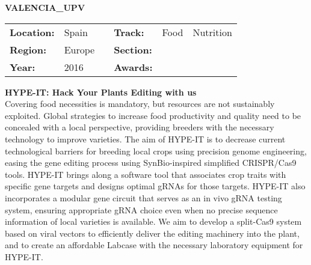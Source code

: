 \textbf{\uppercase{Valencia\_UPV}}
\FloatBarrier
\begin{table}[h]
\begin{tabular}{lp{2.5cm}llll}
\textbf{Location:} & Spain & \multicolumn{1}{|l}{} & \textbf{Track:}   & Food & Nutrition \\
\textbf{Region:}   & Europe   & \multicolumn{1}{|l}{} & \textbf{Section:} &  \\
\textbf{Year:}     & 2016   & \multicolumn{1}{|l}{} & \textbf{Awards:}  &
\end{tabular}
\end{table}
\FloatBarrier
\noindent	\textbf{HYPE-IT: Hack Your Plants Editing with us} \vspace{.2cm}\\
Covering food necessities is mandatory, but resources are not sustainably exploited. Global strategies to increase food productivity and quality need to be concealed with a local perspective, providing breeders with the necessary technology to improve varieties. The aim of HYPE-IT is to decrease current technological barriers for breeding local crops using precision genome engineering, easing the gene editing process using SynBio-inspired simplified CRISPR/Cas9 tools. HYPE-IT brings along a software tool that associates crop traits with specific gene targets and designs optimal gRNAs for those targets. HYPE-IT also incorporates a modular gene circuit that serves as an in vivo gRNA testing system, ensuring appropriate gRNA choice even when no precise sequence information of local varieties is available. We aim to develop a split-Cas9 system based on viral vectors to efficiently deliver the editing machinery into the plant, and to create an affordable Labcase with the necessary laboratory equipment for HYPE-IT.
\vspace{2cm} $ $
\pagebreak

